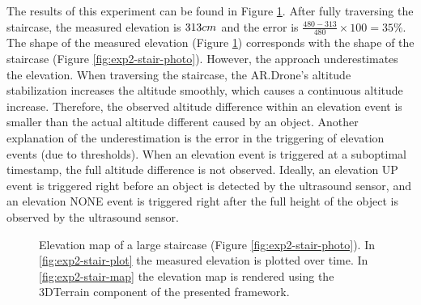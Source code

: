 The results of this experiment can be found in Figure \ref{fig:exp2-results}.
After fully traversing the staircase, the measured elevation is $313\begin{small}cm\end{small}$ and the error is $\frac{480 - 313}{480} \times 100 = 35\%$.
The shape of the measured elevation (Figure \ref{fig:exp2-results}) corresponds with the shape of the staircase (Figure \ref{fig:exp2-stair-photo}).
However, the approach underestimates the elevation.
When traversing the staircase, the AR.Drone's altitude stabilization increases the altitude smoothly, which causes a continuous altitude increase.
Therefore, the observed altitude difference within an elevation event is smaller than the actual altitude different caused by an object.
Another explanation of the underestimation is the error in the triggering of elevation events (due to thresholds).
When an elevation event is triggered at a suboptimal timestamp, the full altitude difference is not observed.
Ideally, an elevation UP event is triggered right before an object is detected by the ultrasound sensor, and an elevation NONE event is triggered right after the full height of the object is observed by the ultrasound sensor.


\begin{figure}[htb!]
  \begin{center}

 \end{center}
  \caption{Elevation map of a large staircase (Figure \ref{fig:exp2-stair-photo}). In \ref{fig:exp2-stair-plot} the measured elevation is plotted over time. In \ref{fig:exp2-stair-map} the elevation map is rendered using the 3DTerrain component of the presented framework.}
  \label{fig:exp2-results}
\end{figure}

